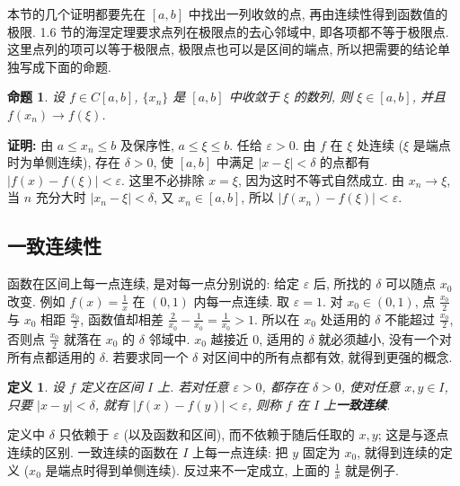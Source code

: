 \documentclass[UTF8,openany]{ctexbook}
\theoremstyle{chinesetextbook}
\newenvironment{cnproof}{\par\indent\textbf{证明:} \ignorespaces}{\par}
\newtheorem*{definitionsingle}{定义}
\newtheorem*{propositionsingle}{命题}
\begin{document}
本节的几个证明都要先在 $[a,b]$ 中找出一列收敛的点, 再由连续性得到函数值的极限. 1.6 节的海涅定理要求点列在极限点的去心邻域中, 即各项都不等于极限点. 这里点列的项可以等于极限点, 极限点也可以是区间的端点, 所以把需要的结论单独写成下面的命题.
\begin{propositionsingle}
设 $f\in C[a,b]$, $\{x_n\}$ 是 $[a,b]$ 中收敛于 $\xi$ 的数列, 则 $\xi\in[a,b]$, 并且 $f(x_n)\to f(\xi)$.
\end{propositionsingle}
\begin{cnproof}
由 $a\le x_n\le b$ 及保序性, $a\le\xi\le b$. 任给 $\varepsilon>0$. 由 $f$ 在 $\xi$ 处连续 ($\xi$ 是端点时为单侧连续), 存在 $\delta>0$, 使 $[a,b]$ 中满足 $|x-\xi|<\delta$ 的点都有 $|f(x)-f(\xi)|<\varepsilon$. 这里不必排除 $x=\xi$, 因为这时不等式自然成立. 由 $x_n\to\xi$, 当 $n$ 充分大时 $|x_n-\xi|<\delta$, 又 $x_n\in[a,b]$, 所以 $|f(x_n)-f(\xi)|<\varepsilon$.
\end{cnproof}
\subsection{一致连续性}
函数在区间上每一点连续, 是对每一点分别说的: 给定 $\varepsilon$ 后, 所找的 $\delta$ 可以随点 $x_0$ 改变. 例如 $\displaystyle f(x)=\frac1x$ 在 $(0,1)$ 内每一点连续. 取 $\varepsilon=1$. 对 $x_0\in(0,1)$, 点 $\displaystyle\frac{x_0}2$ 与 $x_0$ 相距 $\displaystyle\frac{x_0}2$, 函数值却相差 $\displaystyle\frac2{x_0}-\frac1{x_0}=\frac1{x_0}>1$. 所以在 $x_0$ 处适用的 $\delta$ 不能超过 $\displaystyle\frac{x_0}2$, 否则点 $\displaystyle\frac{x_0}2$ 就落在 $x_0$ 的 $\delta$ 邻域中. $x_0$ 越接近 $0$, 适用的 $\delta$ 就必须越小, 没有一个对所有点都适用的 $\delta$. 若要求同一个 $\delta$ 对区间中的所有点都有效, 就得到更强的概念.
\begin{definitionsingle}
设 $f$ 定义在区间 $I$ 上. 若对任意 $\varepsilon>0$, 都存在 $\delta>0$, 使对任意 $x,y\in I$, 只要 $|x-y|<\delta$, 就有 $|f(x)-f(y)|<\varepsilon$, 则称 $f$ 在 $I$ 上\textbf{一致连续}.
\end{definitionsingle}
定义中 $\delta$ 只依赖于 $\varepsilon$ (以及函数和区间), 而不依赖于随后任取的 $x,y$; 这是与逐点连续的区别. 一致连续的函数在 $I$ 上每一点连续: 把 $y$ 固定为 $x_0$, 就得到连续的定义 ($x_0$ 是端点时得到单侧连续). 反过来不一定成立, 上面的 $\displaystyle\frac1x$ 就是例子.
\end{document}
